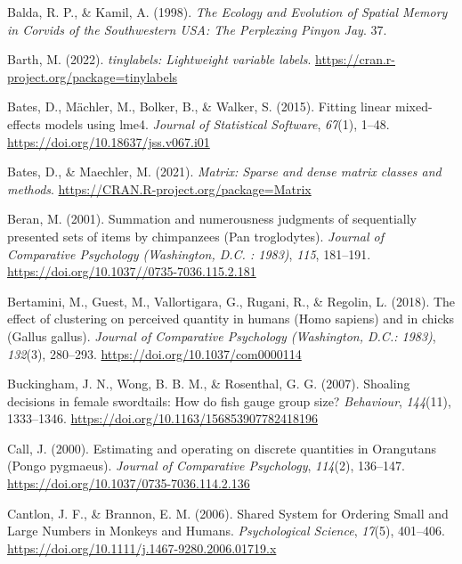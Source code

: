 \documentclass[
  ,doc,floatsintext]{apa6}
\newlength{\cslhangindent}
\newlength{\cslentryspacingunit} %
\newenvironment{CSLReferences}[2] %
 {%
  \setlength{\parindent}{0pt}
  \ifodd #1
  \let\oldpar\par
  \def\par{\hangindent=\cslhangindent\oldpar}
  \fi
  \setlength{\parskip}{#2\cslentryspacingunit}
 }%
 {}
\begin{document}
\begin{CSLReferences}{1}{0}
\leavevmode{}%
Balda, R. P., \& Kamil, A. (1998). \emph{The {Ecology} and {Evolution} of {Spatial} {Memory} in {Corvids} of the {Southwestern} {USA}: {The} {Perplexing} {Pinyon} {Jay}}. 37.

\leavevmode{}%
Barth, M. (2022). \emph{{tinylabels}: Lightweight variable labels}. \url{https://cran.r-project.org/package=tinylabels}

\leavevmode{}%
Bates, D., Mächler, M., Bolker, B., \& Walker, S. (2015). Fitting linear mixed-effects models using {lme4}. \emph{Journal of Statistical Software}, \emph{67}(1), 1--48. \url{https://doi.org/10.18637/jss.v067.i01}

\leavevmode{}%
Bates, D., \& Maechler, M. (2021). \emph{Matrix: Sparse and dense matrix classes and methods}. \url{https://CRAN.R-project.org/package=Matrix}

\leavevmode{}%
Beran, M. (2001). Summation and numerousness judgments of sequentially presented sets of items by chimpanzees ({Pan} troglodytes). \emph{Journal of Comparative Psychology (Washington, D.C. : 1983)}, \emph{115}, 181--191. \url{https://doi.org/10.1037//0735-7036.115.2.181}

\leavevmode{}%
Bertamini, M., Guest, M., Vallortigara, G., Rugani, R., \& Regolin, L. (2018). The effect of clustering on perceived quantity in humans ({Homo} sapiens) and in chicks ({Gallus} gallus). \emph{Journal of Comparative Psychology (Washington, D.C.: 1983)}, \emph{132}(3), 280--293. \url{https://doi.org/10.1037/com0000114}

\leavevmode{}%
Buckingham, J. N., Wong, B. B. M., \& Rosenthal, G. G. (2007). Shoaling decisions in female swordtails: {How} do fish gauge group size? \emph{Behaviour}, \emph{144}(11), 1333--1346. \url{https://doi.org/10.1163/156853907782418196}

\leavevmode{}%
Call, J. (2000). Estimating and operating on discrete quantities in {Orangutans} ({Pongo} pygmaeus). \emph{Journal of Comparative Psychology}, \emph{114}(2), 136--147. \url{https://doi.org/10.1037/0735-7036.114.2.136}

\leavevmode{}%
Cantlon, J. F., \& Brannon, E. M. (2006). Shared {System} for {Ordering} {Small} and {Large} {Numbers} in {Monkeys} and {Humans}. \emph{Psychological Science}, \emph{17}(5), 401--406. \url{https://doi.org/10.1111/j.1467-9280.2006.01719.x}


\end{CSLReferences}
\end{document}
